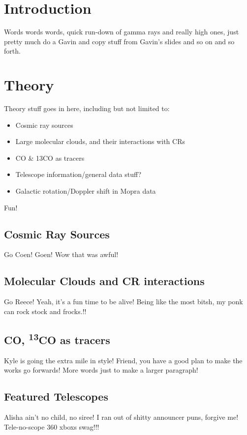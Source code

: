 \documentclass[a4paper,titlepage,oneside]{article}
\newcommand{\elem}[2]{\textsuperscript{#1}{#2}}
\begin{document}
\begin{multicols}{2}
\section{Introduction}
Words words words, quick run-down of gamma rays and really high ones, just pretty much do a Gavin and copy stuff from Gavin's slides and so on and so forth.

\section{Theory}
Theory stuff goes in here, including but not limited to:
\begin{itemize}
\item Cosmic ray sources
\item Large molecular clouds, and their interactions with CRs
\item CO \& 13CO as tracers
\item Telescope information/general data stuff?
\item Galactic rotation/Doppler shift in Mopra data
\end{itemize}
Fun!

\subsection{Cosmic Ray Sources}
Go Coen! Goen! Wow that was awful!

\subsection{Molecular Clouds and CR interactions}
Go Reece! Yeah, it's a fun time to be alive! Being like the most bitsh, my ponk can rock stock and frocks.!!

\subsection{CO, \elem{13}{CO} as tracers}
Kyle is going the extra mile in style! Friend, you have a good plan to make the works go forwards! More words just to make a larger paragraph!

\subsection{Featured Telescopes}
Alisha ain't no child, no siree! I ran out of shitty announcer puns, forgive me! Tele-no-scope 360 xboxs swag!!!


\end{multicols}
\end{document}
